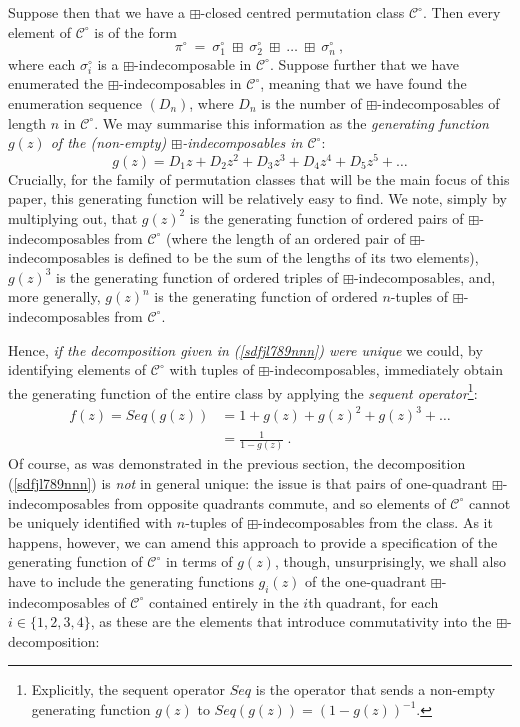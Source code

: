 \documentclass[11pt,a4paper]{article}
\theoremstyle{definition}
\begin{document}
Suppose then that we have a $\boxplus$-closed centred permutation class $\mathcal{C}^{\circ}$. Then every element of $\mathcal{C}^{\circ}$ is of the form
\begin{equation} \label{sdfjl789nnn}
\pi^{\circ} \ = \ \sigma_{1}^{\circ} \ \boxplus \ \sigma_{2}^{\circ} \ \boxplus \ \dots \ \boxplus \ \sigma_{n}^{\circ} \ ,
\end{equation}
where each $\sigma_{i}^{\circ}$ is a $\boxplus$-indecomposable in $\mathcal{C}^{\circ}$. Suppose further that we have enumerated the $\boxplus$-indecomposables in $\mathcal{C}^{\circ}$, meaning that we have found the enumeration sequence $(D_{n})$, where $D_{n}$ is the number of $\boxplus$-indecomposables of length $n$ in $\mathcal{C}^{\circ}$. We may summarise this information as the \emph{generating function $g(z)$ of the (non-empty) $\boxplus$-indecomposables in $\mathcal{C}^{\circ}$}:
\[
g(z) = D_{1}z + D_{2}z^2 + D_{3}z^3 + D_{4}z^4 + D_{5}z^5 + \dots
\]
Crucially, for the family of permutation classes that will be the main focus of this paper, this generating function will be relatively easy to find. We note, simply by multiplying out, that $g(z)^2$ is the generating function of ordered pairs of $\boxplus$-indecomposables from $\mathcal{C}^{\circ}$ (where the length of an ordered pair of $\boxplus$-indecomposables is defined to be the sum of the lengths of its two elements), $g(z)^3$ is the generating function of ordered triples of $\boxplus$-indecomposables, and, more generally, $g(z)^n$ is the generating function of ordered $n$-tuples of $\boxplus$-indecomposables from $\mathcal{C}^{\circ}$.

Hence, \emph{if the decomposition given in (\ref{sdfjl789nnn}) were unique} we could, by identifying elements of $\mathcal{C}^{\circ}$ with tuples of $\boxplus$-indecomposables, immediately obtain the generating function of the entire class by applying the \emph{sequent operator}\footnote{Explicitly, the sequent operator $Seq$ is the operator that sends a non-empty generating function $g(z)$ to $Seq(g(z)) = (1-g(z))^{-1}$.}:
\[
\begin{split}
f(z) = Seq(g(z)) & = 1 + g(z) + g(z)^{2} + g(z)^{3} + \dots \\
 & = \frac{1}{1 - g(z)} \ .
\end{split}
\]
Of course, as was demonstrated in the previous section, the decomposition (\ref{sdfjl789nnn}) is \emph{not} in general unique: the issue is that pairs of one-quadrant $\boxplus$-indecomposables from opposite quadrants commute, and so elements of $\mathcal{C}^{\circ}$ cannot be uniquely identified with $n$-tuples of $\boxplus$-indecomposables from the class. As it happens, however, we can amend this approach to provide a specification of the generating function of $\mathcal{C}^{\circ}$ in terms of $g(z)$, though, unsurprisingly, we shall also have to include the generating functions $g_{i}(z)$ of the one-quadrant $\boxplus$-indecomposables of $\mathcal{C}^{\circ}$ contained entirely in the $i$th quadrant, for each $i \in \{1,2,3,4\}$, as these are the elements that introduce commutativity into the $\boxplus$-decomposition:
\end{document}
